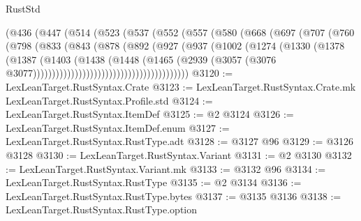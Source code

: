 \begin{lexlean}{RustStd}
\begin{coremodule}
                        (@436
                          (@447
                            (@514
                              (@523
                                (@537
                                  (@552
                                    (@557
                                      (@580
                                        (@668
                                          (@697
                                            (@707
                                              (@760
                                                (@798
                                                  (@833
                                                    (@843
                                                      (@878
                                                        (@892
                                                          (@927
                                                            (@937
                                                              (@1002
                                                                (@1274
                                                                  (@1330
                                                                    (@1378
                                                                      (@1387
                                                                        (@1403
                                                                          (@1438
                                                                            (@1448
                                                                              (@1465
                                                                                (@2939
                                                                                  (@3057
                                                                                    (@3076
                                                                                      @3077)))))))))))))))))))))))))))))))))))))))))
@3120 := LexLeanTarget.RustSyntax.Crate
@3123 := LexLeanTarget.RustSyntax.Crate.mk LexLeanTarget.RustSyntax.Profile.std
@3124 := LexLeanTarget.RustSyntax.ItemDef
@3125 := @2 @3124
@3126 := LexLeanTarget.RustSyntax.ItemDef.enum
@3127 := LexLeanTarget.RustSyntax.RustType.adt
@3128 := @3127 @96
@3129 := @3126 @3128
@3130 := LexLeanTarget.RustSyntax.Variant
@3131 := @2 @3130
@3132 := LexLeanTarget.RustSyntax.Variant.mk
@3133 := @3132 @96
@3134 := LexLeanTarget.RustSyntax.RustType
@3135 := @2 @3134
@3136 := LexLeanTarget.RustSyntax.RustType.bytes
@3137 := @3135 @3136
@3138 := LexLeanTarget.RustSyntax.RustType.option

\end{coremodule}
\end{lexlean}
